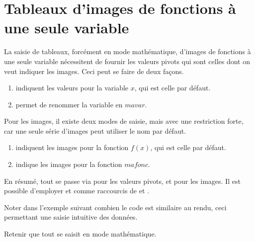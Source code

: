 \documentclass{tutodoc}
\begin{document}
\section{Tableaux d'images de fonctions à une seule variable}

La saisie de tableaux, forcément en mode mathématique, d'images de fonctions à une seule variable nécessitent de fournir les valeurs pivots qui sont celles dont on veut indiquer les images. Ceci peut se faire de deux façons.
%
\begin{enumerate}
	\item {} indiquent les valeurs pour la variable $x$, qui est celle par défaut.

	\item {} permet de renommer la variable en $mavar$.
\end{enumerate}


Pour les images, il existe deux modes de saisie, mais avec une restriction forte, car une seule série d'images peut utiliser le nom par défaut.
%
\begin{enumerate}
	\item {} indiquent les images pour la fonction $f(x)$, qui est celle par défaut.

	\item {} indique les images pour la fonction $mafonc$.
\end{enumerate}

En résumé, tout se passe via  pour les valeurs pivots, et  pour les images.
%
Il est possible d'employer  et  comme raccourcis de  et .



\begin{tdocexa}
    Noter dans l'exemple suivant combien le code est similaire au rendu, ceci permettant une saisie intuitive des données.

\end{tdocexa}


\begin{tdocimp}
	Retenir que tout se saisit en mode mathématique.
\end{tdocimp}
\end{document}
